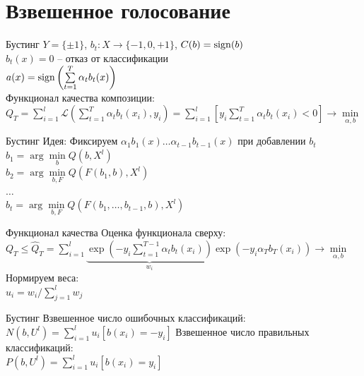 \documentclass[10pt]{beamer}
\begin{document}
\section{Взвешенное голосование}

{
\begin{frame}{Бустинг}
  $Y = \{\pm 1\}$, \qquad $b_t: X\rightarrow \{-1, 0, +1\}$, \qquad $C(b) = \operatorname{sign}(b)$\\
  $b_t(x) = 0$ -- отказ от классификации\\
  \bigbreak
  \pause
  $a(x) = \operatorname{sign}\left(\sum\limits_{t=1}^{T} \alpha_t b_t(x)\right)$\\
  \bigbreak
  Функционал качества композиции:\\
  $Q_T = \sum\limits_{i=1}^l \mathcal{L}(\sum\limits_{t=1}^{T} \alpha_t b_t(x_i), y_i)  = 
  \sum\limits_{i=1}^l \left[ y_i \sum\limits_{t=1}^{T} \alpha_t b_t(x_i) < 0 \right] \rightarrow \min\limits_{\alpha, b}$
\end{frame}
}

{
\begin{frame}{Бустинг}
  \alert{Идея}: Фиксируем $\alpha_1 b_1(x) \dots \alpha_{t-1} b_{t-1}(x)$ при добавлении $b_t$
  \bigbreak
  \pause
  $b_1 = \arg\min\limits_{b} Q(b, X^l)$\\
  $b_2 = \arg\min\limits_{b, F} Q(F(b_1, b), X^l)$\\
  $\dots$\\
  $b_t = \arg\min\limits_{b, F} Q(F(b_1, \dots, b_{t-1}, b), X^l)$
\end{frame}
}

\begin{frame}{Функционал качества}  
  Оценка функционала сверху:\\
  $Q_T \leq \hat{Q}_T = \sum\limits_{i=1}^l \underbrace{ \exp \left( -y_i \sum\limits_{t=1}^{T-1} \alpha_t b_t(x_i) \right) }_{w_i} \exp(-y_i \alpha_T b_T(x_i))\rightarrow \min\limits_{\alpha, b}$\\
  Нормируем веса:\\
  $u_i = w_i / \sum\limits_{j=1}^l w_j$
\end{frame}

\begin{frame}{Бустинг}  
  Взвешенное число ошибочных классификаций:\\
  $N(b, U^l) = \sum\limits_{i=1}^l u_i [b(x_i) = -y_i]$
  \bigbreak
  Взвешенное число правильных классификаций:\\
  $P(b, U^l) = \sum\limits_{i=1}^l u_i [b(x_i) = y_i]$
\end{frame}
\end{document}
